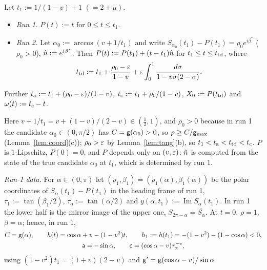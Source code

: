 \begin{definition}[design T]\label{def:T}
Let $t_1:=1/(1-v)+1$ $(=2+\mu)$.
\begin{itemize}
\item \emph{Run 1.} $P(t):=t$ for $0\le t\le t_1$.
\item \emph{Run 2.} Let $\alpha_0:=\arccos(v+1/t_1)$ and write $S_{\alpha_0}(t_1)-P(t_1)=\rho_0e^{i\beta^*}$ ($\rho_0>0$), $\hat n:=e^{i\beta^*}$.
Then $P(t):=P(t_1)+(t-t_1)\hat n$ for $t_1\le t\le t_{\mathrm{td}}$, where
\[
t_{\mathrm{td}}:=t_1+\frac{\rho_0-\varepsilon}{1-v}+\varepsilon\int_0^1\frac{d\sigma}{1-v\sigma(2-\sigma)} .
\]
\end{itemize}
Further $t_{\mathrm a}:=t_1+(\rho_0-\varepsilon)/(1-v)$, $t_{\mathrm c}:=t_1+\rho_0/(1-v)$, $X_0:=P(t_{\mathrm{td}})$ and $\omega(t):=t_{\mathrm c}-t$.
\end{definition}

Here $v+1/t_1=v+(1-v)/(2-v)\in(\frac12,1)$, and $\rho_0>0$ because in run 1 the candidate $\alpha_0\in(0,\pi/2)$ has
$C=\mathsf g(\alpha_0)>0$, so $\rho\ge C/\mathsf g_{\max}$ (Lemma~\ref{lem:coord}(c)); $\rho_0>\varepsilon$ by Lemma~\ref{lem:tang}(b), so $t_1<t_{\mathrm a}<t_{\mathrm{td}}<t_{\mathrm c}$.
$P$ is $1$-Lipschitz, $P(0)=0$, and $P$ depends only on $(v,\varepsilon)$: $\hat n$ is computed from the state of the true candidate $\alpha_0$
at $t_1$, which is determined by run 1.

\emph{Run-1 data.} For $\alpha\in(0,\pi)$ let $(\rho_1,\beta_1)=(\rho_1(\alpha),\beta_1(\alpha))$ be the polar coordinates of
$S_\alpha(t_1)-P(t_1)$ in the heading frame of run 1, $\tau_1:=\tan(\beta_1/2)$, $\tau_\alpha:=\tan(\alpha/2)$ and
$y(\alpha,t_1):=\operatorname{Im}S_\alpha(t_1)$. In run 1 the lower half is the mirror image of the upper one,
$S_{2\pi-\alpha}=\overline{S_\alpha}$. At $t=0$, $\rho=1$, $\beta=\alpha$; hence, in run 1,
\begin{gather*}
C=\mathsf g(\alpha),\qquad h(t)=\cos\alpha+v-(1-v^2)t,\qquad h_1:=h(t_1)=-(1-v^2)-(1-\cos\alpha)<0,\\
\mathsf a=-\sin\alpha,\qquad\mathsf c=(\cos\alpha-v)\tau_\alpha^{-v},
\end{gather*}
using $(1-v^2)t_1=(1+v)(2-v)$ and $\mathsf g'=\mathsf g(\cos\alpha-v)/\sin\alpha$.

